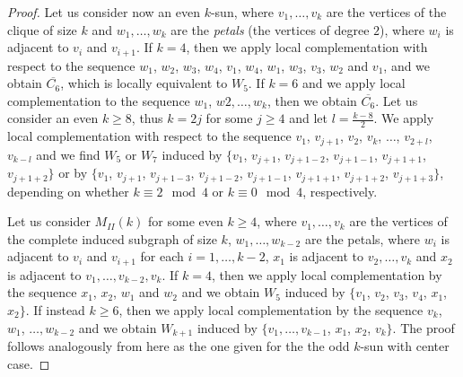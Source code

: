 \documentclass[12pt]{book}
\theoremstyle{plain}
\theoremstyle{remark}
\begin{document}
\begin{proof}

Let us consider now an even $k$-sun, where $v_1, \ldots, v_k$ are the vertices of the clique of size $k$ and $w_1, \ldots, w_k$ are the \emph{petals} (the vertices of degree $2$), where $w_i$ is adjacent to $v_i$ and $v_{i+1}$. If $k=4$, then we apply local complementation with respect to the sequence $w_1$, $w_2$, $w_3$, $w_4$, $v_1$, $w_4$, $w_1$, $w_3$, $v_3$, $w_2$ and $v_1$, and we obtain $\overline{C_6}$, which is locally equivalent to $W_5$.
If $k=6$ and we apply local complementation to the sequence $w_1$, $w2, \ldots, w_k$, then we obtain $\overline{C_6}$.
Let us consider an even $k\geq 8$, thus $k=2j$ for some $j\geq 4$ and let $l=\frac{k-8}{2}$. We apply local complementation with respect to the sequence $v_1$, $v_{j+1}$, $v_2$, $v_k$, $\ldots$, $v_{2+l}$, $v_{k-l}$ and we find $W_5$ or $W_7$ induced by $\{v_1$, $v_{j+1}$, $v_{j+1-2}$, $v_{j+1-1}$, $v_{j+1+1}$, $v_{j+1+2} \}$ or by $\{v_1$, $v_{j+1}$, $v_{j+1-3}$, $v_{j+1-2}$, $v_{j+1-1}$, $v_{j+1+1}$, $v_{j+1+2}$, $v_{j+1+3} \}$, depending on whether $k \equiv 2 \mod 4$ or $k \equiv 0 \mod 4$, respectively.



Let us consider $M_{II}(k)$ for some even $k \geq 4$, where $v_1, \ldots, v_k$ are the vertices of the complete induced subgraph of size $k$, $w_1, \ldots, w_{k-2}$ are the petals, where $w_i$ is adjacent to $v_i$ and $v_{i+1}$ for each $i=1, \ldots, k-2$, $x_1$ is adjacent to $v_2, \ldots, v_k$ and $x_2$ is adjacent to $v_1, \ldots, v_{k-2}, v_k$.
If $k=4$, then we apply local complementation by the sequence $x_1$, $x_2$, $w_1$ and $w_2$ and we obtain $W_5$ induced by $\{ v_1$, $v_2$, $v_3$, $v_4$, $x_1$, $x_2 \}$.
If instead $k \geq 6$, then we apply local complementation by the sequence $v_k$, $w_1$, $\ldots, w_{k-2}$ and we obtain $W_{k+1}$ induced by $\{ v_1, \ldots, v_{k-1}$, $x_1$, $x_2$, $v_k\}$. The proof follows analogously from here as the one given for the the odd $k$-sun with center case.


\end{proof}
\end{document}
